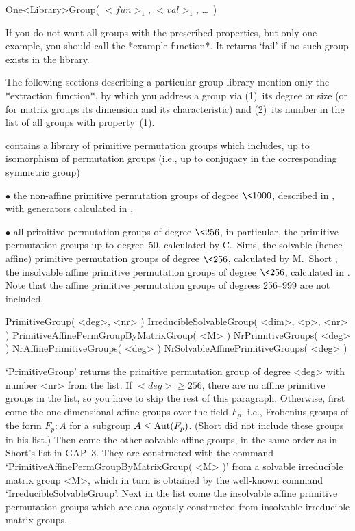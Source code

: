 \)\fmark One<Library>Group( $<fun>_1$, $<val>_1$, \dots\ )

If you  do not want  all groups with the  prescribed properties, but only
one example, you should call the *example function*. It returns `fail' if
no such group exists in the library.

The following sections describing a particular group library mention only
the *extraction   function*, by which  you  address a group   via (1)~its
degree  or   size    (or for  matrix   groups  its    dimension  and  its
characteristic) and  (2)~its  number  in  the list  of all   groups  with
property~(1).


{\GAP} contains a library of primitive permutation groups which includes,
up to  isomorphism of permutation groups   (i.e., up to conjugacy  in the
corresponding symmetric group)
\beginlist
  \item{$\bullet$} the  non-affine primitive permutation groups of degree
    $\<1000$,   described    in  \cite{DixonMortimer88},  with generators
    calculated in \cite{Theissen97},
  \item{$\bullet$} all  primitive  permutation groups of  degree $\<256$,
    in particular,
    \itemitem{$\circ$} the primitive permutation groups up to degree~50,
      calculated by C.~Sims,
    \itemitem{$\circ$}  the solvable (hence affine) primitive permutation
      groups of degree $\<256$, calculated by M.~Short \cite{Short92},
    \itemitem{$\circ$} the insolvable affine primitive permutation groups
      of degree $\<256$, calculated in \cite{Theissen97}.
\endlist
Note that the affine primitive permutation groups of degrees 256--999 are
not included.

\>PrimitiveGroup( <deg>, <nr> )
\>IrreducibleSolvableGroup( <dim>, <p>, <nr> )
\>PrimitiveAffinePermGroupByMatrixGroup( <M> )
\>NrPrimitiveGroups( <deg> )
\>NrAffinePrimitiveGroups( <deg> )
\>NrSolvableAffinePrimitiveGroups( <deg> )

`PrimitiveGroup' returns the primitive permutation  group of degree <deg>
with number <nr>  from the list. If  $<deg>\ge 256$, there  are no affine
primitive  groups in  the list, so   you have to  skip  the rest  of this
paragraph. Otherwise, first  come the one-dimensional affine  groups over
the field $F_p$, i.e., Frobenius groups of the  form $ F_p\mathbin:A$ for
a  subgroup $A\le{\rm Aut}(F_p)$. (Short did  not include these groups in
his list.) Then come the other solvable  affine groups, in the same order
as in Short's list in {\sf GAP~3}. They  are constructed with the command
`PrimitiveAffinePermGroupByMatrixGroup(      <M>  )'   from   a  solvable
irreducible matrix group <M>, which in turn is obtained by the well-known
command `IrreducibleSolvableGroup'. Next  in the list come the insolvable
affine primitive  permutation groups   which are  analogously constructed
from insolvable irreducible matrix groups.

